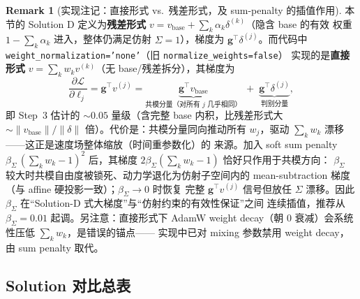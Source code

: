 \documentclass[11pt,a4paper]{article}
\newcommand{\loss}{\mathcal{L}}
\theoremstyle{definition}
\newtheorem{remark}{Remark}
\begin{document}
\begin{remark}[实现注记：直接形式 vs.\ 残差形式，及 sum-penalty 的插值作用]
\label{rem:impl_form}
本节的 Solution D 定义为\textbf{残差形式}
$v = v_{\mathrm{base}} + \sum_k \alpha_k \delta^{(k)}$（隐含 base 的有效
权重 $1-\sum_k\alpha_k$ 进入，整体仍满足仿射 $\Sigma=1$），梯度为
$\mathbf{g}^\top\delta^{(j)}$。而代码中
\texttt{weight\_normalization='none'}（旧 \texttt{normalize\_weights=false}）
实现的是\textbf{直接形式} $v=\sum_k w_k v^{(k)}$（无 base/残差拆分），其梯度为
\begin{equation}
\frac{\partial\loss}{\partial \ell_j} = \mathbf{g}^\top v^{(j)}
= \underbrace{\mathbf{g}^\top v_{\mathrm{base}}}_{\text{共模分量（对所有 } j \text{ 几乎相同）}}
\;+\; \underbrace{\mathbf{g}^\top \delta^{(j)}}_{\text{判别分量}},
\end{equation}
即 Step~3 估计的 $\sim 0.05$ 量级（含完整 base 内积，比残差形式大
$\sim\|v_{\mathrm{base}}\|/\|\delta\|$ 倍）。代价是：共模分量同向推动所有
$w_j$，驱动 $\sum_k w_k$ 漂移——这正是速度场整体缩放（时间重参数化）的
来源。加入 soft sum penalty
$\beta_\Sigma\,(\sum_k w_k - 1)^2$ 后，其梯度
$2\beta_\Sigma(\sum_k w_k - 1)$ 恰好只作用于共模方向：
$\beta_\Sigma$ 较大时共模自由度被锁死、动力学退化为仿射子空间内的
mean-subtraction 梯度（与 affine 硬投影一致）；$\beta_\Sigma\to 0$ 时恢复
完整 $\mathbf{g}^\top v^{(j)}$ 信号但放任 $\Sigma$ 漂移。因此
$\beta_\Sigma$ 在``Solution-D 式大梯度''与``仿射约束的有效性保证''之间
连续插值，推荐从 $\beta_\Sigma = 0.01$ 起调。另注意：直接形式下 AdamW
weight decay（朝 $0$ 衰减）会系统性压低 $\sum_k w_k$，是错误的锚点——
实现中已对 mixing 参数禁用 weight decay，由 sum penalty 取代。
\end{remark}

\subsection{Solution 对比总表}
\end{document}
